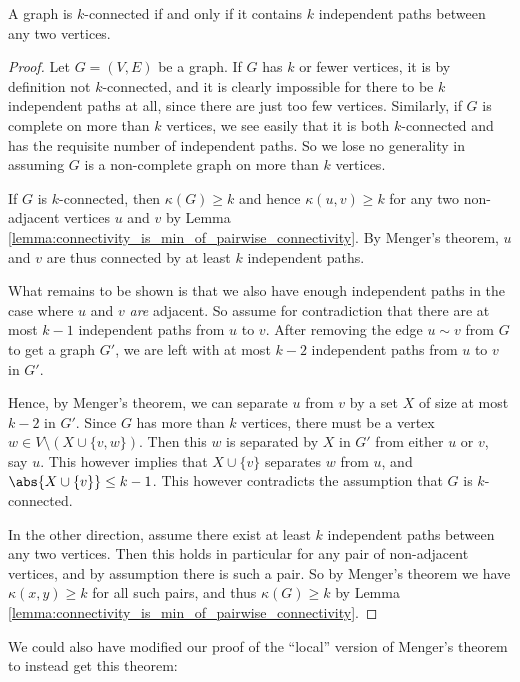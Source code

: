 \documentclass[nobib]{tufte-handout}
\begin{document}
\begin{theorem}
  A graph is $k$-connected if and only if it contains $k$ independent paths between any two vertices.

  \begin{proof}
    Let $G = (V,E)$ be a graph. If $G$ has $k$ or fewer vertices, it is by definition not $k$-connected, and it is clearly impossible for there to be $k$ independent paths at all, since there are just too few vertices. Similarly, if $G$ is complete on more than $k$ vertices, we see easily that it is both $k$-connected and has the requisite number of independent paths. So we lose no generality in assuming $G$ is a non-complete graph on more than $k$ vertices.

    If $G$ is $k$-connected, then $\kappa(G) \geq k$ and hence $\kappa(u,v) \geq k$ for any two non-adjacent vertices $u$ and $v$ by Lemma \ref{lemma:connectivity_is_min_of_pairwise_connectivity}. By Menger's theorem, $u$ and $v$ are thus connected by at least $k$ independent paths.

    What remains to be shown is that we also have enough independent paths in the case where $u$ and $v$ \emph{are} adjacent. So assume for contradiction that there are at most $k-1$ independent paths from $u$ to $v$. After removing the edge $u \sim v$ from $G$ to get a graph $G'$, we are left with at most $k - 2$ independent paths from $u$ to $v$ in $G'$.

    Hence, by Menger's theorem, we can separate $u$ from $v$ by a set $X$ of size at most $k-2$ in $G'$. Since $G$ has more than $k$ vertices, there must be a vertex $w \in V \setminus (X \cup \{v,w\})$. Then this $w$ is separated by $X$ in $G'$ from either $u$ or $v$, say $u$. This however implies that $X \cup \{v\}$ separates $w$ from $u$, and $\abs{X \cup \{v\}} \leq k - 1$. This however contradicts the assumption that $G$ is $k$-connected.

    In the other direction, assume there exist at least $k$ independent paths between any two vertices. Then this holds in particular for any pair of non-adjacent vertices, and by assumption there is such a pair. So by Menger's theorem we have $\kappa(x,y)\geq k$ for all such pairs, and thus $\kappa(G) \geq k$ by Lemma \ref{lemma:connectivity_is_min_of_pairwise_connectivity}.
  \end{proof}
\end{theorem}

We could also have modified our proof of the ``local'' version of Menger's theorem to instead get this theorem:
\end{document}
